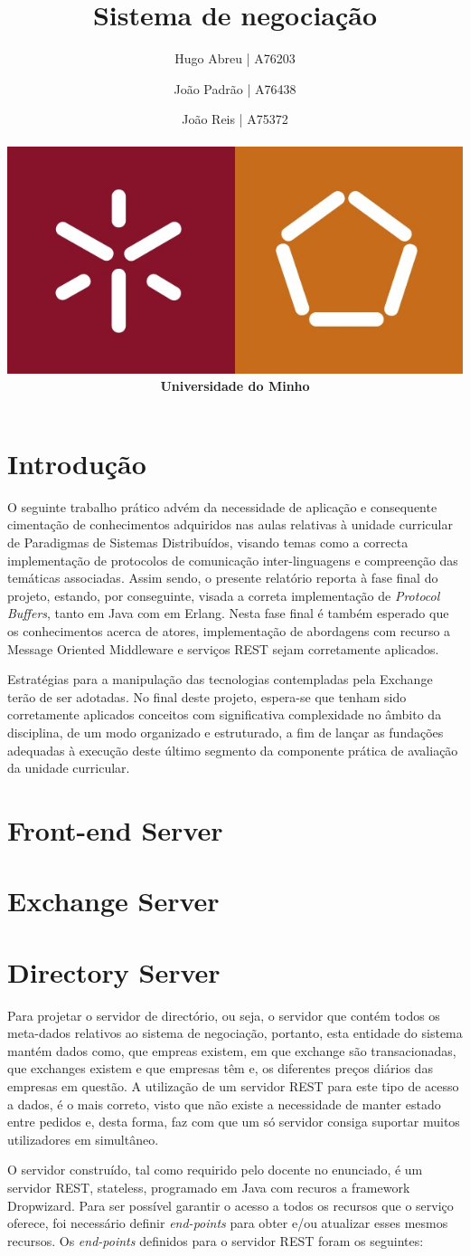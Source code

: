 \documentclass[a4paper,12pt]{article}
\title{Sistema de negociação}
\author{Hugo Abreu | A76203 \and João Padrão | A76438\and João Reis | A75372
\\\\ \includegraphics[scale=0.25]{um_eeng} \\ \textbf{Universidade do Minho}}
\begin{document}
\maketitle


\section{Introdução}
O seguinte trabalho prático advém da necessidade de aplicação e consequente cimentação de conhecimentos adquiridos nas aulas relativas à unidade curricular de Paradigmas de Sistemas Distribuídos, visando temas como a correcta implementação de protocolos de comunicação inter-linguagens e compreenção das temáticas associadas. Assim sendo, o presente relatório reporta à fase final do projeto, estando, por conseguinte, visada a correta implementação de \textit{Protocol Buffers}, tanto em Java com em Erlang. Nesta fase final é também esperado que os conhecimentos acerca de atores, implementação de abordagens com recurso a Message Oriented Middleware e serviços REST sejam corretamente aplicados. 
\par Estratégias para a manipulação das tecnologias contempladas pela Exchange terão de ser adotadas. No final deste projeto, espera-se que tenham sido corretamente aplicados conceitos com significativa complexidade no âmbito da disciplina, de um modo organizado e estruturado, a fim de lançar as fundações adequadas à execução deste último segmento da componente prática de avaliação da unidade curricular.

\section{Front-end Server}

\section{Exchange Server}

\section{Directory Server}
Para projetar o servidor de directório, ou seja, o servidor que contém todos os meta-dados relativos ao sistema de negociação, portanto, esta entidade do sistema mantém dados como, que empreas existem, em que exchange são transacionadas, que exchanges existem e que empresas têm e, os diferentes preços diários das empresas em questão. A utilização de um servidor REST para este tipo de acesso a dados, é o mais correto, visto que não existe a necessidade de manter estado entre pedidos e, desta forma, faz com que um só servidor consiga suportar muitos utilizadores em simultâneo.
\par O servidor construído, tal como requirido pelo docente no enunciado, é um servidor REST, stateless, programado em Java com recuros a framework Dropwizard. Para ser possível garantir o acesso a todos os recursos que o serviço oferece, foi necessário definir \textit{end-points} para obter e/ou atualizar esses mesmos recursos. Os \textit{end-points} definidos para o servidor REST foram os seguintes:
\end{document}
